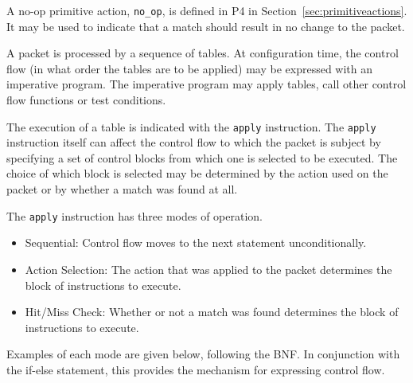 \documentclass[12pt]{article}
\begin{document}
A no-op primitive action, \texttt{no_op}, is defined in P4 in 
Section~\ref{sec:primitiveactions}. It may be used to indicate that 
a match should result in no change to the packet.


A packet is processed by a sequence of \matchaction tables.  At configuration 
time, the control flow (in what order the tables are to be applied) may be 
expressed with an imperative program. The imperative program may apply tables, 
call other control flow functions or test conditions.

The execution of a table is indicated with the \texttt{apply} instruction. The \texttt{apply} instruction 
itself can affect the control flow to which the packet is subject by specifying 
a set of control blocks from which one is selected to be executed. The choice 
of which block is selected may be determined by the action used on the packet 
or by whether a match was found at all.

The \texttt{apply} instruction has three modes of operation.

\begin{itemize}
\item
Sequential: Control flow moves to the next statement unconditionally.
\item
Action Selection: The action that was applied to the packet determines the 
block of instructions to execute.
\item
Hit/Miss Check: Whether or not a match was found determines the block of instructions 
to execute.
\end{itemize}


Examples of each mode are given below, following the BNF. In conjunction with 
the if-else statement, this provides the mechanism for expressing control 
flow.
\end{document}
